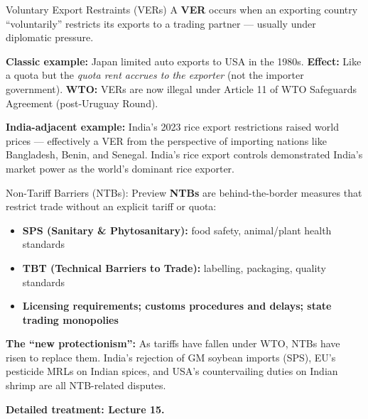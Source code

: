 \documentclass[
  ignorenonframetext,
  aspectratio=169,
]{beamer}
\makeatletter
\providecommand{\tightlist}{%
  \setlength{\itemsep}{0pt}\setlength{\parskip}{0pt}}
\let\quarto@originallabel\label
\DeclareRobustCommand*{\label}[1]{\quarto@originallabel{#1}}
\makeatother
\begin{document}
\begin{frame}{Voluntary Export Restraints (VERs)}
\label{voluntary-export-restraints-vers}
A \textbf{VER} occurs when an exporting country ``voluntarily''
restricts its exports to a trading partner --- usually under diplomatic
pressure.

\textbf{Classic example:} Japan limited auto exports to USA in the
1980s. \textbf{Effect:} Like a quota but the \emph{quota rent accrues to
the exporter} (not the importer government). \textbf{WTO:} VERs are now
illegal under Article 11 of WTO Safeguards Agreement (post-Uruguay
Round).

\textbf{India-adjacent example:} India's 2023 rice export restrictions
raised world prices --- effectively a VER from the perspective of
importing nations like Bangladesh, Benin, and Senegal. India's rice
export controls demonstrated India's market power as the world's
dominant rice exporter.
\end{frame}

\begin{frame}{Non-Tariff Barriers (NTBs): Preview}
\label{non-tariff-barriers-ntbs-preview}
\textbf{NTBs} are behind-the-border measures that restrict trade without
an explicit tariff or quota:

\begin{itemize}
\tightlist
\item
  \textbf{SPS (Sanitary \& Phytosanitary):} food safety, animal/plant
  health standards
\item
  \textbf{TBT (Technical Barriers to Trade):} labelling, packaging,
  quality standards
\item
  \textbf{Licensing requirements; customs procedures and delays; state
  trading monopolies}
\end{itemize}

\textbf{The ``new protectionism'':} As tariffs have fallen under WTO,
NTBs have risen to replace them. India's rejection of GM soybean imports
(SPS), EU's pesticide MRLs on Indian spices, and USA's countervailing
duties on Indian shrimp are all NTB-related disputes.

\textbf{Detailed treatment: Lecture 15.}
\end{frame}
\end{document}
